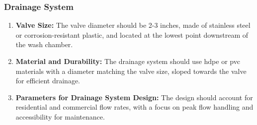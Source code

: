 \documentclass[12pt]{article} %
\begin{document}
\subsubsection{Drainage System}
   \begin{enumerate}
   \item \textbf{Valve Size:} The valve diameter should be 2-3 inches, made of stainless steel or corrosion-resistant plastic, and located at the lowest point downstream of the wash chamber.
   \item \textbf{Material and Durability:} The drainage system should use \acrshort{hdpe} or \acrshort{pvc} materials with a diameter matching the valve size, sloped towards the valve for efficient drainage.
   \item \textbf{Parameters for Drainage System Design:} The design should account for residential and commercial flow rates, with a focus on peak flow handling and accessibility for maintenance.
   \end{enumerate}


\clearpage
\end{document}
